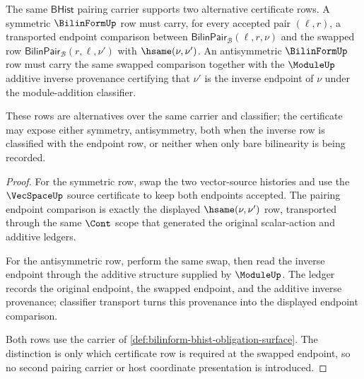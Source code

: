 \begin{theorem}
\label{thm:bilinform-symmetry-antisymmetry-obligations}
The same $\mathsf{BHist}$ pairing carrier supports two alternative certificate rows. A symmetric $\BilinFormUp$ row must carry, for every accepted pair $(\ell,r)$, a transported endpoint comparison between $\mathsf{BilinPair}_{\mathcal{B}}(\ell,r,\nu)$ and the swapped row $\mathsf{BilinPair}_{\mathcal{B}}(r,\ell,\nu')$ with $\hsame(\nu,\nu')$. An antisymmetric $\BilinFormUp$ row must carry the same swapped comparison together with the $\ModuleUp$ additive inverse provenance certifying that $\nu'$ is the inverse endpoint of $\nu$ under the module-addition classifier.

These rows are alternatives over the same carrier and classifier; the certificate may expose either symmetry, antisymmetry, both when the inverse row is classified with the endpoint row, or neither when only bare bilinearity is being recorded.
\end{theorem}
\begin{proof}
For the symmetric row, swap the two vector-source histories and use the $\VecSpaceUp$ source certificate to keep both endpoints accepted. The pairing endpoint comparison is exactly the displayed $\hsame(\nu,\nu')$ row, transported through the same $\Cont$ scope that generated the original scalar-action and additive ledgers.

For the antisymmetric row, perform the same swap, then read the inverse endpoint through the additive structure supplied by $\ModuleUp$. The ledger records the original endpoint, the swapped endpoint, and the additive inverse provenance; classifier transport turns this provenance into the displayed endpoint comparison.

Both rows use the carrier of \autoref{def:bilinform-bhist-obligation-surface}. The distinction is only which certificate row is required at the swapped endpoint, so no second pairing carrier or host coordinate presentation is introduced.
\end{proof}

